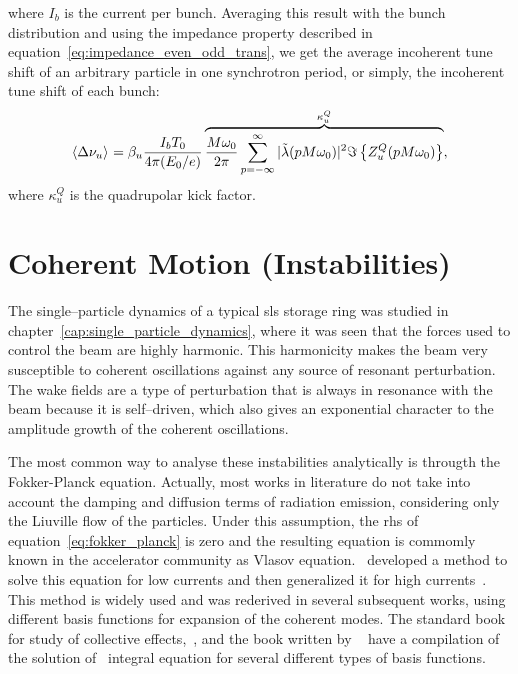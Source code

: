     where $I_b$ is the current per bunch. Averaging this result with the bunch distribution and using the impedance property described in equation~\eqref{eq:impedance_even_odd_trans}, we get the average incoherent tune shift of an arbitrary particle in one synchrotron period, or simply, the incoherent tune shift of each bunch:
    \begin{align}\label{eq:incoherent_tune_shift}
        \left\langle \Delta\nu_u \right\rangle_{{}} = \beta_u\frac{I_bT_0}{4\pi(E_0/e)}
        \overbrace{
        \frac{M\omega_0}{2\pi} \sum_{p=-\infty}^\infty |\tilde{\lambda}(pM\omega_0)|^2\Im\left\{Z^Q_u(pM\omega_0)\right\}}^{\kappa^Q_u},
    \end{align}
    where $\kappa^Q_u$ is the quadrupolar kick factor.

\section{Coherent Motion (Instabilities)}

    The single--particle dynamics of a typical \gls{sls} storage ring was studied in chapter~\ref{cap:single_particle_dynamics}, where it was seen that the forces used to control the beam are highly harmonic. This harmonicity makes the beam very susceptible to coherent oscillations against any source of resonant perturbation. The wake fields are a type of perturbation that is always in resonance with the beam because it is self--driven, which also gives an exponential character to the amplitude growth of the coherent oscillations.

    The most common way to analyse these instabilities analytically is througth the Fokker-Planck equation. Actually, most works in literature do not take into account the damping and diffusion terms of radiation emission, considering only the Liuville flow of the particles. Under this assumption, the \gls{rhs} of equation~\eqref{eq:fokker_planck} is zero and the resulting equation is commomly known in the accelerator community as Vlasov equation.~ developed a method to solve this equation for low currents and then generalized it for high currents~\cite{Sacherer1977}. This method is widely used and was rederived in several subsequent works, using different basis functions for expansion of the coherent modes. The standard book for study of collective effects,~, and the book written by ~ have a compilation of the solution of~ integral equation for several different types of basis functions.

